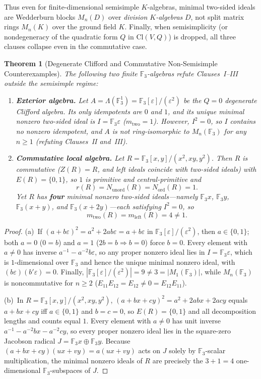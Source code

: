 \documentclass[11pt]{article}
\newtheorem{theorem}{Theorem}[section]
\theoremstyle{definition}
\newcommand{\Cl}{\mathrm{Cl}}
\newcommand{\Mat}{M}
\newcommand{\F}{\mathbb{F}}
\begin{document}
Thus even for finite-dimensional semisimple $K$-algebras, minimal two-sided
ideals are Wedderburn blocks $\Mat_n(D)$ over \emph{division $K$-algebras} $D$,
not split matrix rings $\Mat_n(K)$ over the ground field $K$. Finally, when
semisimplicity (or nondegeneracy of the quadratic form $Q$ in $\Cl(V,Q)$) is
dropped, all three clauses collapse even in the commutative case.

\begin{theorem}[Degenerate Clifford and Commutative Non-Semisimple Counterexamples]
\label{thm:non-semisimple}
The following two finite $\F_3$-algebras refute Clauses~I--III outside the
semisimple regime:
\begin{enumerate}
\item[(a)] \textbf{Exterior algebra.} Let $A = \Lambda(\F_3^1) =
\F_3[\varepsilon]/(\varepsilon^2)$ be the $Q = 0$ degenerate Clifford algebra.
Its only idempotents are $0$ and $1$, and its unique minimal nonzero two-sided
ideal is $I = \F_3 \varepsilon$ ($m_{\mathrm{two}} = 1$). However, $I^2 = 0$, so
$I$ contains \emph{no} nonzero idempotent, and $A$ is not ring-isomorphic to
$\Mat_n(\F_3)$ for any $n \ge 1$ (refuting Clauses~II and~III).
\item[(b)] \textbf{Commutative local algebra.} Let $R = \F_3[x,y]/(x^2, xy, y^2)$.
Then $R$ is commutative ($Z(R) = R$, and left ideals coincide with two-sided
ideals) with $E(R) = \{0, 1\}$, so $1$ is primitive and central-primitive and
\[
  r(R) = N_{\mathrm{unord}}(R) = N_{\mathrm{ord}}(R) = 1.
\]
Yet $R$ has \textbf{four} minimal nonzero two-sided ideals---namely $\F_3 x$,
$\F_3 y$, $\F_3(x+y)$, and $\F_3(x+2y)$---each satisfying $I^2 = 0$, so
\[
  m_{\mathrm{two}}(R) = m_{\mathrm{left}}(R) = 4 \neq 1.
\]
\end{enumerate}
\end{theorem}

\begin{proof}
(a)~If $(a + b\varepsilon)^2 = a^2 + 2ab\varepsilon = a + b\varepsilon$ in
$\F_3[\varepsilon]/(\varepsilon^2)$, then $a \in \{0,1\}$; both $a = 0$ ($0 = b$)
and $a = 1$ ($2b = b \Rightarrow b = 0$) force $b = 0$. Every element with
$a \neq 0$ has inverse $a^{-1} - a^{-2}b\varepsilon$, so any proper nonzero ideal
lies in $I = \F_3\varepsilon$, which is $1$-dimensional over $\F_3$ and hence the
unique minimal nonzero ideal, with $(b\varepsilon)(b'\varepsilon) = 0$. Finally,
$|\F_3[\varepsilon]/(\varepsilon^2)| = 9 \neq 3 = |\Mat_1(\F_3)|$, while
$\Mat_n(\F_3)$ is noncommutative for $n \ge 2$ ($E_{11}E_{12} = E_{12} \neq 0 =
E_{12}E_{11}$).

(b)~In $R = \F_3[x,y]/(x^2,xy,y^2)$, $(a + bx + cy)^2 = a^2 + 2abx + 2acy$ equals
$a + bx + cy$ iff $a \in \{0,1\}$ and $b = c = 0$, so $E(R) = \{0,1\}$ and all
decomposition lengths and counts equal $1$. Every element with $a \neq 0$ has
unit inverse $a^{-1} - a^{-2}bx - a^{-2}cy$, so every proper nonzero ideal lies
in the square-zero Jacobson radical $J = \F_3 x \oplus \F_3 y$. Because
$(a + bx + cy)(u x + v y) = a(u x + v y)$ acts on $J$ solely by $\F_3$-scalar
multiplication, the minimal nonzero ideals of $R$ are precisely the
$3 + 1 = 4$ one-dimensional $\F_3$-subspaces of $J$.
\end{proof}
\end{document}
